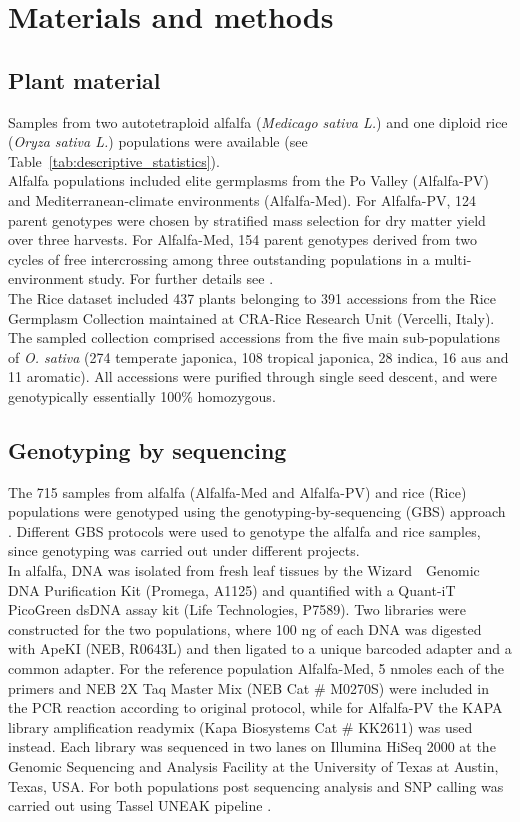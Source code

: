 \section{Materials and methods}

\subsection{Plant material}
\label{sec:plant_material}

Samples from two autotetraploid alfalfa (\emph{Medicago sativa L.}) and one diploid rice (\emph{Oryza sativa L.}) populations were available (see Table~\ref{tab:descriptive_statistics}).\\
Alfalfa populations included elite germplasms from the Po Valley (Alfalfa-PV) and Mediterranean-climate environments (Alfalfa-Med). For Alfalfa-PV, 124 parent genotypes were chosen by stratified mass selection for dry matter yield over three harvests. For Alfalfa-Med, 154 parent genotypes derived from two cycles of free intercrossing among three outstanding populations in a multi-environment study. For further details see \cite{Annicchiarico2015}. \\
The Rice dataset included 437 plants belonging to 391 accessions from the Rice Germplasm Collection maintained at CRA-Rice Research Unit (Vercelli, Italy). The sampled collection comprised accessions from the five main sub-populations of \emph{O. sativa} (274 temperate japonica, 108 tropical japonica, 28 indica, 16 aus and 11 aromatic). All accessions were purified through single seed descent, and were genotypically essentially 100\% homozygous.

\subsection{Genotyping by sequencing}
\label{sec:overview}

The 715 samples from alfalfa (Alfalfa-Med and Alfalfa-PV) and rice (Rice) populations were genotyped using the genotyping-by-sequencing (GBS) approach \cite{elshire_robust_2011}. Different GBS protocols were used to genotype the alfalfa and rice samples, since genotyping was carried out under different projects.\\
In alfalfa, DNA was isolated from fresh leaf tissues by the Wizard~\textregistered~Genomic DNA Purification Kit (Promega, A1125) and quantified with a Quant-iT PicoGreen dsDNA assay kit (Life Technologies, P7589). Two libraries were constructed for the two populations, where 100 ng of each DNA was digested with ApeKI (NEB, R0643L) and then ligated to a unique barcoded adapter and a common adapter. For the reference population Alfalfa-Med, 5 nmoles each of the primers and NEB 2X Taq Master Mix (NEB Cat \# M0270S) were included in the PCR reaction according to \cite{elshire_robust_2011} original protocol, while for Alfalfa-PV the KAPA library amplification readymix (Kapa Biosystems Cat \# KK2611) was used instead. Each library was sequenced in two lanes on Illumina HiSeq 2000 at the Genomic Sequencing and Analysis Facility at the University of Texas at Austin, Texas, USA. For both populations post sequencing analysis and SNP calling was carried out using Tassel UNEAK pipeline \cite{lu_switchgrass_2013}.

